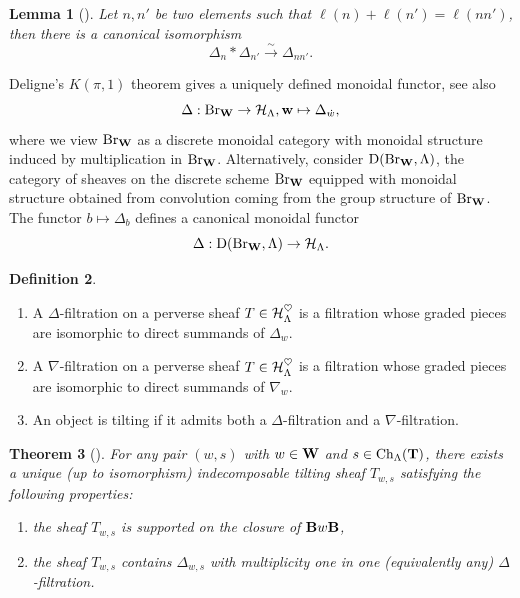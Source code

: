 \documentclass[article, 10pt, oneside, reqno]{amsart}
\theoremstyle{plain}
\newtheorem{thm}{Theorem}[subsection]
\newtheorem{lem}[thm]{Lemma}
\theoremstyle{definition}
\newtheorem{defi}[thm]{Definition}
\theoremstyle{remark}
\newcommand{\wbf}{\mathbf{w}}
\begin{document}
\begin{lem}[]
Let $n,n'$ be two elements such that $\ell(n) + \ell(n') = \ell(nn')$, then there is a canonical isomorphism 
$$\Delta_{n} * \Delta_{n'} \xrightarrow{\sim} \Delta_{nn'}.$$
\end{lem}

Deligne's $K(\pi, 1)$ theorem gives a uniquely defined monoidal functor, see also \cite[Section 1.2]{BonnafeDudasRouquier} 
$$\Delta : \Br_{\Wbf} \to \Hcal_{\Lambda}, \wbf \mapsto \Delta_{\dot{w}},$$
where we view $\mathrm{Br}_{\mathbf{W}}$ as a discrete monoidal category with monoidal structure induced by multiplication in $\mathrm{Br}_{\mathbf{W}}$. Alternatively, consider $\mathrm{D}(\mathrm{Br}_{\mathbf{W}}, \Lambda)$, the category of sheaves on the discrete scheme $\mathrm{Br}_{\mathbf{W}}$ equipped with monoidal structure obtained from convolution coming from the group structure of $\mathrm{Br}_{\mathbf{W}}$. The functor $b \mapsto \Delta_b$ defines a canonical monoidal functor 
$$\Delta : \mathrm{D}(\mathrm{Br}_{\mathbf{W}}, \Lambda) \to \mathcal{H}_{\Lambda}.$$

\begin{defi}
\begin{enumerate}
\item A $\Delta$-filtration on a perverse sheaf $T \in \mathcal{H}_{\Lambda}^{\heartsuit}$ is a filtration whose graded pieces are isomorphic to direct summands of $\Delta_w$.
\item A $\nabla$-filtration on a perverse sheaf $T \in \mathcal{H}_{\Lambda}^{\heartsuit}$ is a filtration whose graded pieces are isomorphic to direct summands of $\nabla_w$. 
\item An object is tilting if it admits both a $\Delta$-filtration and a $\nabla$-filtration.
\end{enumerate}
\end{defi} 

\begin{thm}[]
For any pair $(w,s)$ with $w \in \mathbf{W}$ and $s\in\mathrm{Ch}_{\Lambda}(\mathbf{T})$, there exists a unique (up to isomorphism) indecomposable tilting sheaf $T_{w,s}$ satisfying the following properties: 
\begin{enumerate}
\item the sheaf $T_{w,s}$ is supported on the closure of $\mathbf{B} w\mathbf{B}$,
\item the sheaf $T_{w,s}$ contains $\Delta_{w,s}$ with multiplicity one in one (equivalently any) $\Delta$-filtration.
\end{enumerate}
\end{thm}
\end{document}
